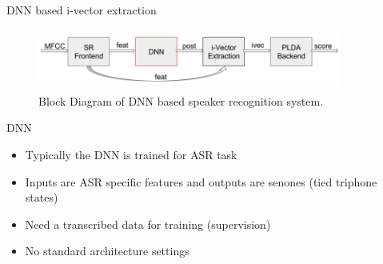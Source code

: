 \documentclass{beamer}
\begin{document}
\begin{frame}{DNN based i-vector extraction}
  \begin{figure}
      \centering
      \includegraphics[width=10cm, height=2cm]{figures/DNN_ivec_blockdiagram.png}
      \vspace{-4pt}
      \caption{Block Diagram of DNN based speaker recognition system.}
      \label{fig:dnn_ivec}
  \end{figure}
  \vspace{-15pt}
 \begin{block}{DNN}
  \begin{itemize}
    \item Typically the DNN is trained for ASR task
    \item Inputs are ASR specific features and outputs are senones (tied triphone states)
    \item Need a transcribed data for training (supervision)
    \item No standard architecture settings
 \end{itemize}
 \end{block}
\end{frame}
\end{document}
